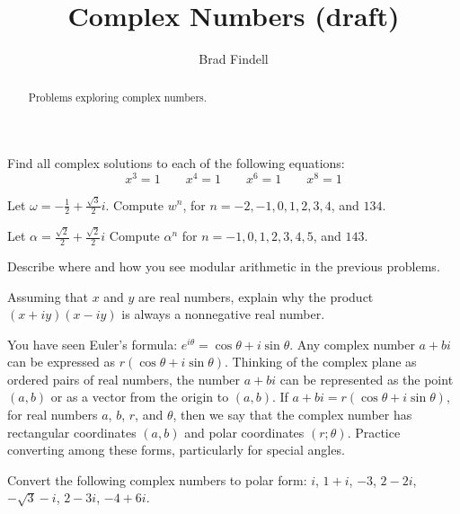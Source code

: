 \documentclass[space,nooutcomes]{ximera}
\title{Complex Numbers (draft)}
\author{Brad Findell}
\begin{document}
\begin{abstract}
Problems exploring complex numbers.   
\end{abstract}
\maketitle


\begin{problem}
Find all complex solutions to each of the following equations: 
\[
x^3=1 \qquad x^4=1 \qquad x^6 = 1 \qquad x^8 = 1
\]
\vfill
\end{problem}
\newpage 

\begin{problem}
Let $\omega=-\tfrac{1}{2}+\tfrac{\sqrt{3}}{2}i$.  Compute $w^n$, for $n = -2, -1, 0, 1, 2, 3, 4$, and $134$.  
\vfill
\end{problem}

\begin{problem} %
Let $\alpha=\tfrac{\sqrt{2}}{2}+\tfrac{\sqrt{2}}{2}i$ Compute $\alpha^n$ for $n = -1, 0, 1, 2, 3, 4, 5$, and $143$.  
\vfill
\end{problem}

\begin{problem}
Describe where and how you see modular arithmetic in the previous problems.
\vfill
\end{problem}

\newpage

\begin{problem}
Assuming that $x$ and $y$ are real numbers, explain why the product $(x+iy)(x-iy)$ is always a nonnegative real number. 
\vfill
\end{problem}


You have seen Euler's formula: $e^{i\theta}=\cos\theta +i\sin\theta$.  Any complex number $a+bi$ can be expressed as $r(\cos\theta +i\sin\theta)$.  Thinking of the complex plane as ordered pairs of real numbers, the number $a+bi$ can be represented as the point $(a,b)$ or as a vector from the origin to
$(a,b)$.  If $a+bi = r(\cos\theta +i\sin\theta)$, for real numbers $a$, $b$, $r$, and $\theta$, then we say that the complex number has rectangular coordinates $(a,b)$ and polar coordinates $(r;\theta)$.  Practice converting among these forms, particularly for special angles.


\begin{problem}
Convert the following complex numbers to polar form: $i$, $1 + i$,  $-3$, $2 - 2i$, $-\sqrt{3}-i$, $2 - 3i$, $-4 + 6i$.  
\vfill 
\end{problem}
\end{document}
